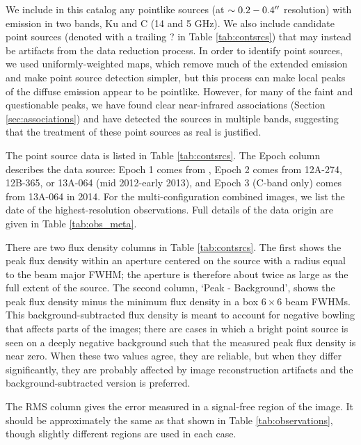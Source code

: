 

We include in this catalog any pointlike sources (at $\sim0.2-0.4\mbox{$^{\prime\prime}$}$
resolution) with emission in two bands, Ku and C (14 and 5 GHz).  We also
include candidate point sources (denoted with a trailing ? in Table
\ref{tab:contsrcs}) that may instead be artifacts from the data reduction
process.  In order to identify point sources, we used uniformly-weighted maps,
which remove much of the extended emission and make point source detection
simpler, but this process can make local peaks of the diffuse emission appear
to be pointlike.  However, for many of the faint and questionable peaks, we
have found clear near-infrared associations (Section \ref{sec:associations})
and have detected the sources in multiple bands, suggesting that the treatment
of these point sources as real is justified.

The point source data is listed in Table \ref{tab:contsrcs}.  The Epoch column
describes the data source: Epoch 1 comes from \citet{Mehringer1994a}, Epoch 2
comes from 12A-274, 12B-365, or 13A-064 (mid 2012-early
2013), and Epoch 3 (C-band only) comes from
13A-064 in 2014. For the multi-configuration combined images, we list the date
of the highest-resolution observations.  Full details of the data origin
are given in Table \ref{tab:obs_meta}.

There are two flux density columns in Table \ref{tab:contsrcs}.  The first
shows the peak flux density within an aperture centered on the source with a
radius equal to the beam major FWHM; the aperture is therefore about twice as
large as the full extent of the source.  The second column, `Peak -
Background', shows the peak flux density minus the minimum flux density in a
box $6\times6$ beam FWHMs.  This background-subtracted flux density is meant to
account for negative bowling that affects parts of the images; there are cases
in which a bright point source is seen on a deeply negative background such
that the measured peak flux density is near zero.  When these two values agree,
they are reliable, but when they differ significantly, they are probably
affected by image reconstruction artifacts and the background-subtracted
version is preferred.

The RMS column gives the error measured in a signal-free region of the image.
It should be approximately the same as that shown in Table
\ref{tab:observations}, though slightly different regions are used in each
case.




